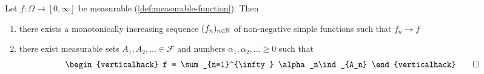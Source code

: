 \begin{lemma}\label{lem:approximation-by-simple-functions}
Let $f : \Omega \to [0,\infty]$ be measurable (\autoref{def:measurable-function}).
Then %
\begin{enumerate}[label=(\roman*)]
\item 
there exists a monotonically increasing sequence $(f_n)_{n \in \mathbb{N}}$ of non-negative simple functions such that $f_n \to f$
\item 
there exist measurable sets $A_1,A_2,\ldots \in \mathcal{F}$ and numbers $\alpha_1,\alpha_2,\ldots \geq 0$ such that
\[
\begin{verticalhack}
f
=
\sum_{n=1}^{\infty} \alpha_n\ind_{A_n}
\end{verticalhack}
\qedhere
\]
\end{enumerate}
\end{lemma}
